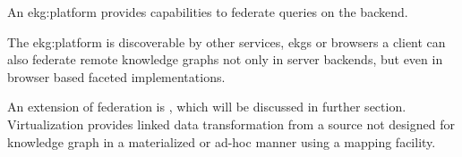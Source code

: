 An \gls{ekg:platform} provides capabilities to federate queries on the backend.

The \gls{ekg:platform} is discoverable by other services, \glspl{ekg} or browsers
a client can also federate remote knowledge graphs not only in server backends,
but even in browser based faceted implementations.

An extension of federation is , which will be discussed in further section.
Virtualization provides linked data transformation from a source not designed for knowledge graph
in a materialized or ad-hoc manner using a mapping facility.